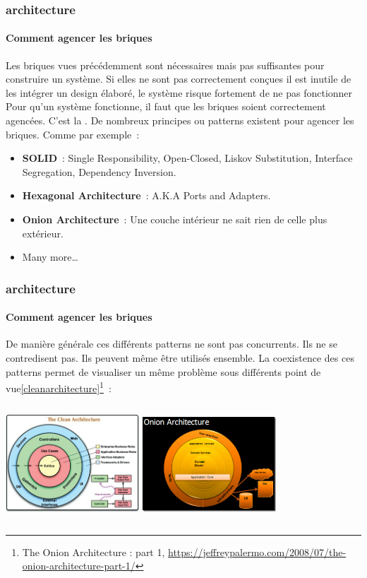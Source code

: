 \documentclass{beamer}
\begin{document}
    \begin{frame}
        \transdissolve
        \frametitle{ architecture}
        \framesubtitle{Comment agencer les briques}
        Les briques vues précédemment sont nécessaires mais pas suffisantes pour construire un système.
        Si elles ne sont pas correctement conçues il est inutile de les intégrer un design élaboré, le système risque fortement de ne pas fonctionner
        \bigbreak
        Pour qu'un système fonctionne, il faut que les briques soient correctement agencées.
        C'est la .
        \bigbreak
        De nombreux principes ou patterns existent pour agencer les briques.
        Comme par exemple~:
        \begin{itemize}
            \item \textbf{SOLID}~: Single Responsibility, Open-Closed, Liskov Substitution, Interface Segregation, Dependency Inversion.
            \item \textbf{Hexagonal Architecture}~: A.K.A Ports and Adapters.
            \item \textbf{Onion Architecture}~: Une couche intérieur ne sait rien de celle plus extérieur.
            \item Many more\ldots
        \end{itemize}
    \end{frame}

    \begin{frame}
        \transdissolve
        \frametitle{ architecture}
        \framesubtitle{Comment agencer les briques}
        De manière générale ces différents patterns ne sont pas concurrents.
        Ils ne se contredisent pas.
        Ils peuvent même être utilisés ensemble.
        \bigbreak
        La coexistence des ces patterns permet de visualiser un même problème sous différents point de vue\cref{cleanarchitecture}\footnotestep\footnote{The Onion Architecture : part 1, \url{https://jeffreypalermo.com/2008/07/the-onion-architecture-part-1/}}~:
        \begin{columns}
            \centering
            \includegraphics[width=5cm]{image/the-clean-architecture}
            \centering
            \includegraphics[width=5cm]{image/onion-architecture}
        \end{columns}
    \end{frame}
\end{document}
